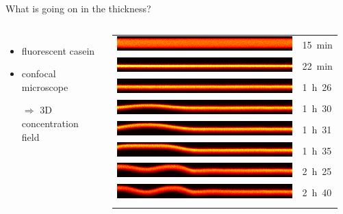 \documentclass[xcolor=table]{beamer}
\begin{document}
\begin{frame}{What is going on in the thickness?}
\begin{columns}
\begin{itemize}
\item fluorescent casein
\item confocal microscope
\item[$\Rightarrow$] 3D concentration field
\end{itemize}

\setlength{\tabcolsep}{1pt}
\begin{tabular}{p{\columnwidth}l}
	\includegraphics[width=\columnwidth, height=0.061\columnwidth]{coupe_cloque_t000.png}& \SI{15}{\minute}\\
	\includegraphics[width=\columnwidth, height=0.061\columnwidth]{coupe_cloque_t011.png} & \SI{22}{\minute}\\
	\includegraphics[width=\columnwidth, height=0.061\columnwidth]{coupe_cloque_t110.png} & \SI{1}{\hour}~26\onslide<2->{\\
	\includegraphics[width=\columnwidth, height=0.061\columnwidth]{coupe_cloque_t116.png} & \SI{1}{\hour}~30\\
	\includegraphics[width=\columnwidth, height=0.061\columnwidth]{coupe_cloque_t117.png} & \SI{1}{\hour}~31\\
	\includegraphics[width=\columnwidth, height=0.061\columnwidth]{coupe_cloque_t123.png} & \SI{1}{\hour}~35\\
	\includegraphics[width=\columnwidth, height=0.061\columnwidth]{coupe_cloque_t200.png} & \SI{2}{\hour}~25\\
	\includegraphics[width=\columnwidth, height=0.061\columnwidth]{coupe_cloque_t221.png} & \SI{2}{\hour}~40\\}
\end{tabular}


\end{columns}
\end{frame}
\end{document}

